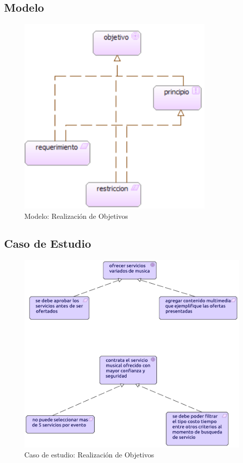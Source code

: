 \subsection{Modelo}
\begin{figure}[h!]
	\centering
	\includegraphics[width=0.6\linewidth]{Arquitectura/Motivacion/imgs/realizacionObjMetamodelo.PNG}
	\caption{Modelo: Realización de Objetivos}
\end{figure}
\subsection{Caso de Estudio}

\begin{figure}[h!]
	\centering
	\includegraphics[width=\linewidth]{Arquitectura/Motivacion/imgs/realizacionObj.pdf}
	\caption{Caso de estudio: Realización de Objetivos}
	\label{fig:comportamiento}
\end{figure}


